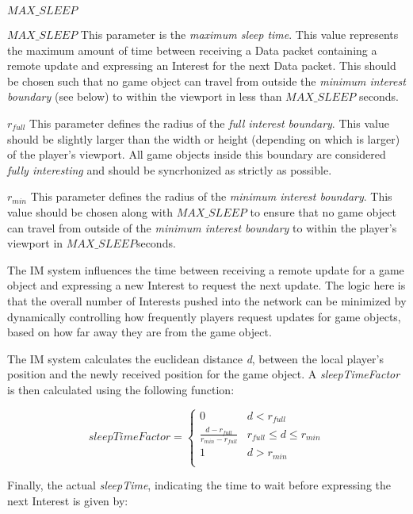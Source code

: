 \begin{labeling}{$MAX\_SLEEP$ }
    \item [$MAX\_SLEEP$] This parameter is the \textit{maximum sleep time}. This value represents the maximum amount of time between receiving a Data packet containing a remote update and expressing an Interest for the next Data packet. This should be chosen such that no game object can travel from outside the \textit{minimum interest boundary} (see below) to within the viewport in less than $MAX\_SLEEP$ seconds. 
    \item [$r_{full}$] This parameter defines the radius of the \textit{full interest boundary}. This value should be slightly larger than the width or height (depending on which is larger) of the player's viewport. All game objects inside this boundary are considered \textit{fully interesting} and should be syncrhonized as strictly as possible.
    \item [$r_{min}$] This parameter defines the radius of the \textit{minimum interest boundary}. This value should be chosen along with $MAX\_SLEEP$ to ensure that no game object can travel from outside of the \textit{minimum interest boundary} to within the player's viewport in $MAX\_SLEEP$seconds. 
\end{labeling}
    
The IM system influences the time between receiving a remote update for a game object and expressing a new Interest to request the next update. The logic here is that the overall number of Interests pushed into the network can be minimized by dynamically controlling how frequently players request updates for game objects, based on how far away they are from the game object.

The IM system calculates the euclidean distance \textit{d}, between the local player's position and the newly received position for the game object. A \textit{sleepTimeFactor} is then calculated using the following function:


\begin{equation}
sleepTimeFactor =
\begin{cases} 
    0 & d < r_{full} \\
    \frac{d - r_{full}}{r_{min} - r_{full}} & r_{full} \leq d \leq r_{min} \\
    1 & d > r_{min} \\
\end{cases}
\end{equation}

Finally, the actual \textit{sleepTime}, indicating the time to wait before expressing the next Interest is given by:

